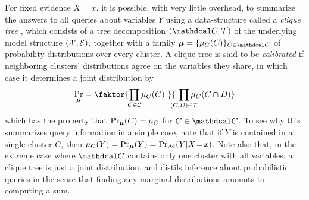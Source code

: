 \documentclass{article}
\begin{document}
For fixed evidence
$X{=}x$, it is possible, with very
little overhead, to summarize the answers to all queries about variables
$Y$ using a data-structure called a \emph{clique tree}
\citep[see][\S10]{koller2009probabilistic},
which consists of
a tree decomposition $(\mathdcal C, \mathcal T)$
of the underlying model structure $(\cal X, E)$, together with a family $\bmu = \{\mu_C(C)\}_{ C \in \mathdcal C}$ of probability distributions over every cluster.
A clique tree is said to be \emph{calibrated} if neighboring clusters' distributions agree on the variables they share,
in which case it determines a joint distribution by
\begin{equation}
    \Pr_{\bmu} = \faktor
        {\prod_{\mathclap{C \in \cal C}} \mu_C(C)~}
        {~\prod_{\mathclap{(C,D) \in \cal T}} \mu_{C}(C \cap D)}
    \label{eq:cliquedist}
\end{equation}
which has the property that $\Pr_{\boldsymbol\mu}(C) = \mu_C$ for $C \in \mathdcal C$.
To see why this summarizes query information in a simple case, note that if $Y$ is contained in a single cluster $C$, then $\mu_C(Y) = \Pr_{\boldsymbol\mu}(Y) = \Pr_{\cal M}(Y | X \!=\! x)$.
Note also that, in the extreme case where $\mathdcal C$ contains only one cluster with all variables, a clique tree is just a joint distribution, and distils inference about probabilistic queries in the sense that finding any marginal distributions amounts to computing a sum.
\end{document}
